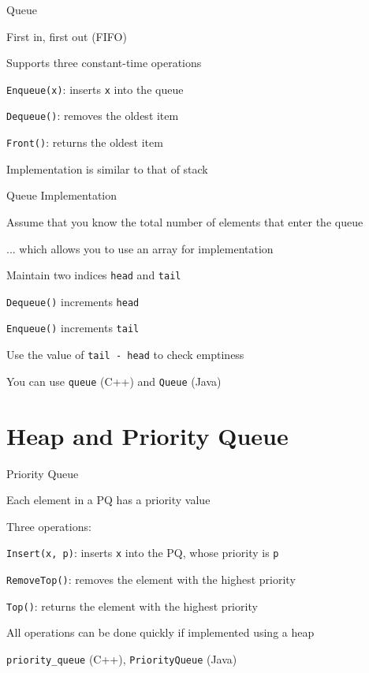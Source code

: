 \documentclass[13pt,onlymath]{beamer}
\begin{document}
\begin{frame}[fragile]{Queue}
\BIT
\item First in, first out (FIFO)
\item Supports three constant-time operations
\BIT
\item \verb,Enqueue(x),: inserts \verb,x, into the queue
\item \verb,Dequeue(),: removes the oldest item
\item \verb,Front(),: returns the oldest item
\EIT
\vfill
\item Implementation is similar to that of stack
\EIT
\end{frame}

\begin{frame}[fragile]{Queue Implementation}
\BIT
\item Assume that you know the total number of elements that enter the queue
\BIT
\item ... which allows you to use an array for implementation
\EIT
\item Maintain two indices \verb,head, and \verb,tail,
\BIT
\item \verb,Dequeue(), increments \verb,head,
\item \verb,Enqueue(), increments \verb,tail,
\item Use the value of \verb,tail - head, to check emptiness
\EIT
\item You can use \verb,queue, (C++) and \verb,Queue, (Java)
\EIT
\end{frame}


\section{Heap and Priority Queue}

\begin{frame}[fragile]{Priority Queue}
\BIT
\item Each element in a PQ has a priority value
\item Three operations:
\BIT
\item \verb.Insert(x, p).: inserts \verb,x, into the PQ, whose priority is \verb,p,
\item \verb,RemoveTop(),: removes the element with the highest priority
\item \verb,Top(),: returns the element with the highest priority
\EIT
\item All operations can be done quickly if implemented using a heap
\item \verb,priority_queue, (C++), \verb,PriorityQueue, (Java)
\EIT
\end{frame}
\end{document}
